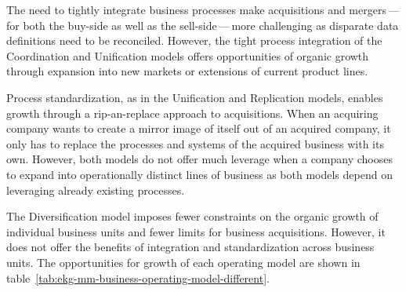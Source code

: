 The need to tightly integrate business processes make acquisitions and mergers\,---\,for both the buy-side as well
as the sell-side\,---\,more challenging as disparate data definitions need to be reconciled.
However, the tight process integration of the Coordination and Unification models offers opportunities of
organic growth through expansion into new markets or extensions of current product lines.

Process standardization, as in the Unification and Replication models, enables growth through a
rip-an-replace approach to acquisitions.
When an acquiring company wants to create a mirror image of itself out of an acquired company,
it only has to replace the processes and systems of the acquired business with its own.
However, both models do not offer much leverage when a company chooses to expand into operationally
distinct lines of business as both models depend on leveraging already existing processes.

The Diversification model imposes fewer constraints on the organic growth of individual business units and
fewer limits for business acquisitions.
However, it does not offer the benefits of integration and standardization across business units.
The opportunities for growth of each operating model are shown in
table~\ref{tab:ekg-mm-business-operating-model-different}.

